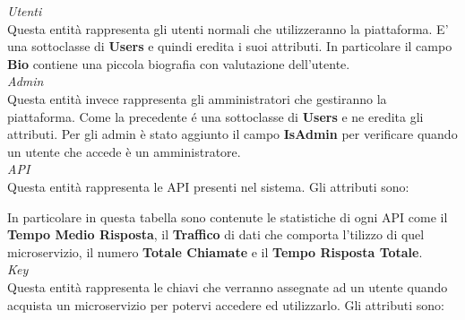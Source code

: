 {{			\textit{Utenti}\\
			Questa entità rappresenta gli utenti normali che utilizzeranno la piattaforma. E' una sottoclasse di \textbf{Users} e quindi eredita i suoi attributi. In particolare il campo \textbf{Bio} contiene una piccola biografia con valutazione dell'utente.  \\
			\textit{Admin}\\
			Questa entità invece rappresenta gli amministratori che gestiranno la piattaforma. Come la precedente é una sottoclasse di \textbf{Users} e ne eredita gli attributi. Per gli admin è stato aggiunto il campo \textbf{IsAdmin} per verificare quando un utente che accede è un amministratore. \\
			\textit{API}\\
			Questa entità rappresenta le API presenti nel sistema. Gli attributi sono:
			\begin{center}
			\begin{table}[H]\caption{Entità API}
			\label{EA}
			\end{table}
			\end{center}
			In particolare in questa tabella sono contenute le statistiche di ogni API come il \textbf{Tempo Medio Risposta}, il \textbf{Traffico} di dati che comporta l'tilizzo di quel microservizio, il numero \textbf{Totale Chiamate} e il \textbf{Tempo Risposta Totale}. \\
			\textit{Key}\\
			Questa entità rappresenta le chiavi che verranno assegnate ad un utente quando acquista un microservizio per potervi accedere ed utilizzarlo. Gli attributi sono: \\
}}
